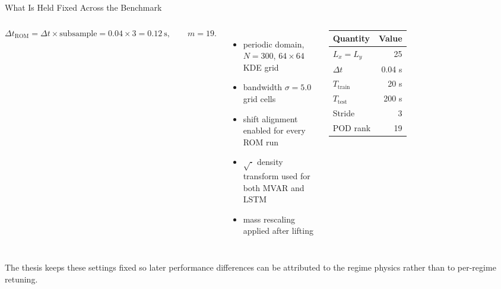 \begin{frame}[shrink=8]{What Is Held Fixed Across the Benchmark}
\small
\begin{columns}[T]
\[
  \Delta t_{\mathrm{ROM}}
  =
  \Delta t \times \text{subsample}
  =
  0.04 \times 3
  =
  0.12\ \mathrm{s},
  \qquad
  m=19.
\]

\begin{itemize}
  \item periodic domain, $N=300$, $64\times 64$ KDE grid
  \item bandwidth $\sigma=5.0$ grid cells
  \item shift alignment enabled for every ROM run
  \item $\sqrt{\cdot}$ density transform used for both MVAR and LSTM
  \item mass rescaling applied after lifting
\end{itemize}

\centering
\small
\begin{tabular}{lr}
\toprule
Quantity & Value \\
\midrule
$L_x=L_y$ & 25 \\
$\Delta t$ & 0.04 s \\
$T_{\mathrm{train}}$ & 20 s \\
$T_{\mathrm{test}}$ & 200 s \\
Stride & 3 \\
POD rank & 19 \\
\bottomrule
\end{tabular}
\end{columns}

\medskip
The thesis keeps these settings fixed so later performance differences can be attributed to the regime physics rather than to per-regime retuning.
\end{frame}
\fi

